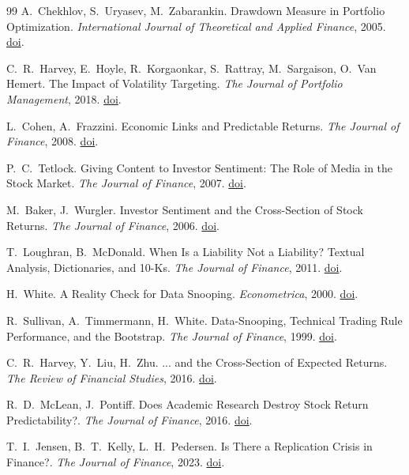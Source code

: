 \begin{thebibliography}{99}
 A.~Chekhlov, S.~Uryasev, M.~Zabarankin. Drawdown Measure in Portfolio Optimization. \emph{International Journal of Theoretical and Applied Finance}, 2005. \href{https://doi.org/10.1142/s0219024905002767}{doi}.

 C.~R.~Harvey, E.~Hoyle, R.~Korgaonkar, S.~Rattray, M.~Sargaison, O.~Van Hemert. The Impact of Volatility Targeting. \emph{The Journal of Portfolio Management}, 2018. \href{https://doi.org/10.3905/jpm.2018.45.1.014}{doi}.

 L.~Cohen, A.~Frazzini. Economic Links and Predictable Returns. \emph{The Journal of Finance}, 2008. \href{https://doi.org/10.1111/j.1540-6261.2008.01379.x}{doi}.

 P.~C.~Tetlock. Giving Content to Investor Sentiment: The Role of Media in the Stock Market. \emph{The Journal of Finance}, 2007. \href{https://doi.org/10.1111/j.1540-6261.2007.01232.x}{doi}.

 M.~Baker, J.~Wurgler. Investor Sentiment and the Cross-Section of Stock Returns. \emph{The Journal of Finance}, 2006. \href{https://doi.org/10.1111/j.1540-6261.2006.00885.x}{doi}.

 T.~Loughran, B.~McDonald. When Is a Liability Not a Liability? Textual Analysis, Dictionaries, and 10-Ks. \emph{The Journal of Finance}, 2011. \href{https://doi.org/10.1111/j.1540-6261.2010.01625.x}{doi}.

 H.~White. A Reality Check for Data Snooping. \emph{Econometrica}, 2000. \href{https://doi.org/10.1111/1468-0262.00152}{doi}.

 R.~Sullivan, A.~Timmermann, H.~White. Data-Snooping, Technical Trading Rule Performance, and the Bootstrap. \emph{The Journal of Finance}, 1999. \href{https://doi.org/10.1111/0022-1082.00163}{doi}.

 C.~R.~Harvey, Y.~Liu, H.~Zhu. ... and the Cross-Section of Expected Returns. \emph{The Review of Financial Studies}, 2016. \href{https://doi.org/10.1093/rfs/hhv059}{doi}.

 R.~D.~McLean, J.~Pontiff. Does Academic Research Destroy Stock Return Predictability?. \emph{The Journal of Finance}, 2016. \href{https://doi.org/10.1111/jofi.12365}{doi}.

 T.~I.~Jensen, B.~T.~Kelly, L.~H.~Pedersen. Is There a Replication Crisis in Finance?. \emph{The Journal of Finance}, 2023. \href{https://doi.org/10.1111/jofi.13249}{doi}.


\end{thebibliography}
